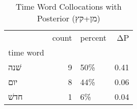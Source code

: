 \begin{table}[htbp!]
\centering
\caption{Time Word Collocations with Posterior (מן+קץ)}
\label{table:postמן+קץ_head_cpd}
\begin{tabular}{lrlr}
\toprule
{} &  count & percent &    ΔP \\
time word &        &         &       \\
\midrule
שׁנה      &      9 &     50\% &  0.41 \\
יום       &      8 &     44\% &  0.06 \\
חדשׁ      &      1 &      6\% &  0.04 \\
\bottomrule
\end{tabular}
\end{table}
